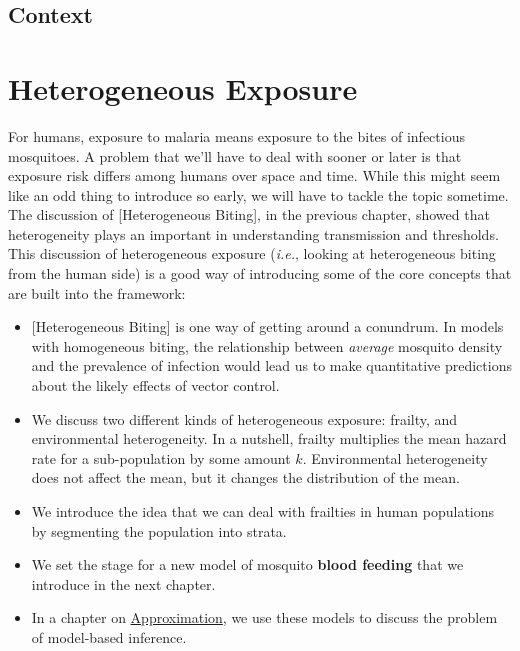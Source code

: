 \documentclass[
]{book}
\begin{document}
\hypertarget{context}{%
\section{Context}\label{context}}

\hypertarget{heterogeneous-exposure}{%
\chapter{Heterogeneous Exposure}\label{heterogeneous-exposure}}

For humans, exposure to malaria means exposure to the bites of infectious mosquitoes. A problem that we'll have to deal with sooner or later is that exposure risk differs among humans over space and time. While this might seem like an odd thing to introduce so early, we will have to tackle the topic sometime. The discussion of {[}Heterogeneous Biting{]}, in the previous chapter, showed that heterogeneity plays an important in understanding transmission and thresholds. This discussion of heterogeneous exposure (\emph{i.e.}, looking at heterogeneous biting from the human side) is a good way of introducing some of the core concepts that are built into the framework:

\begin{itemize}
\item
  {[}Heterogeneous Biting{]} is one way of getting around a conundrum. In models with homogeneous biting, the relationship between \emph{average} mosquito density and the prevalence of infection would lead us to make quantitative predictions about the likely effects of vector control.
\item
  We discuss two different kinds of heterogeneous exposure: frailty, and environmental heterogeneity. In a nutshell, frailty multiplies the mean hazard rate for a sub-population by some amount \(k\). Environmental heterogeneity does not affect the mean, but it changes the distribution of the mean.
\item
  We introduce the idea that we can deal with frailties in human populations by segmenting the population into strata.
\item
  We set the stage for a new model of mosquito \textbf{blood feeding} that we introduce in the next chapter.
\item
  In a chapter on \protect\hyperlink{approximation}{Approximation}, we use these models to discuss the problem of model-based inference.
\end{itemize}
\end{document}
